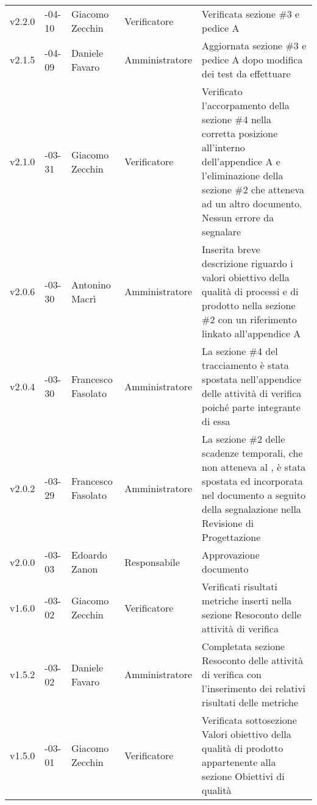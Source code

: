 \begin{longtable} { >{\centering}p{1.4cm} >{\centering}p{2cm} >{\centering}p{2.3cm} >{\centering}p{2.7cm} p{5.5cm} }
	\addlinespace[0.4em]
	\midrule
	\addlinespace[0.4em]
	v2.2.0 & 2017-04-10 & Giacomo Zecchin & Verificatore & Verificata sezione \#3 e pedice A \\
	\addlinespace[0.4em]
	\midrule
	\addlinespace[0.4em]
	v2.1.5 & 2017-04-09 & Daniele Favaro & Amministratore & Aggiornata sezione \#3 e pedice A dopo modifica dei test da effettuare \\
	\addlinespace[0.4em]
	\midrule
	\addlinespace[0.4em]
	v2.1.0 & 2017-03-31 & Giacomo Zecchin & Verificatore & Verificato l'accorpamento della sezione \#4 nella corretta posizione all'interno dell'appendice A e l'eliminazione della sezione \#2 che atteneva ad un altro documento. Nessun errore da segnalare\\
	\addlinespace[0.4em]
	\midrule
	\addlinespace[0.4em]
	v2.0.6 & 2017-03-30 & Antonino Macrì & Amministratore & Inserita breve descrizione riguardo i valori obiettivo della qualità di processi e di prodotto nella sezione \#2 con un riferimento linkato all'appendice A \\  
	\addlinespace[0.4em]
	\midrule
	\addlinespace[0.4em]
	v2.0.4 & 2017-03-30 & Francesco Fasolato & Amministratore & La sezione \#4 del tracciamento è stata spostata nell'appendice delle attività di verifica poiché parte integrante di essa \\ 
	\addlinespace[0.4em]
	\midrule
	\addlinespace[0.4em]
	v2.0.2 & 2017-03-29 & Francesco Fasolato & Amministratore & La sezione \#2 delle scadenze temporali, che non atteneva al \pianodiqualifica, è stata spostata ed incorporata nel documento \pianodiprogetto a seguito della segnalazione nella Revisione di Progettazione \\ 
	\addlinespace[0.4em]
	\midrule
	\addlinespace[0.4em]	
	v2.0.0 & 2017-03-03 & Edoardo Zanon & Responsabile & Approvazione documento \\ 
	\addlinespace[0.4em]
	\midrule
	\addlinespace[0.4em]
	v1.6.0 & 2017-03-02 & Giacomo Zecchin & Verificatore & Verificati risultati metriche inserti nella sezione Resoconto delle attività di verifica \\
	\addlinespace[0.4em]
	\midrule
	\addlinespace[0.4em]
	v1.5.2 & 2017-03-02 & Daniele Favaro & Amministratore & Completata sezione Resoconto delle attività di verifica con l'inserimento dei relativi risultati delle metriche\\
	\addlinespace[0.4em]
	\midrule
	\addlinespace[0.4em]
	v1.5.0 & 2017-03-01 & Giacomo Zecchin & Verificatore & Verificata sottosezione Valori obiettivo della qualità di prodotto appartenente alla sezione Obiettivi di qualità \\

\end{longtable}
